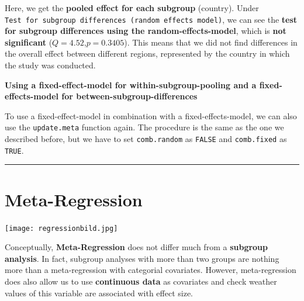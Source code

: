 \documentclass[]{book}
\begin{document}
Here, we get the \textbf{pooled effect for each subgroup} (country). Under \texttt{Test\ for\ subgroup\ differences\ (random\ effects\ model)}, we can see the \textbf{test for subgroup differences using the random-effects-model}, which is \textbf{not significant} (\(Q=4.52\),\(p=0.3405\)). This means that we did not find differences in the overall effect between different regions, represented by the country in which the study was conducted.

\begin{rmdachtung}
\textbf{Using a fixed-effect-model for within-subgroup-pooling and a
fixed-effects-model for between-subgroup-differences}

To use a fixed-effect-model in combination with a fixed-effects-model,
we can also use the \texttt{update.meta} function again. The procedure
is the same as the one we described before, but we have to set
\texttt{comb.random} as \texttt{FALSE} and \texttt{comb.fixed} as
\texttt{TRUE}.
\end{rmdachtung}

\begin{center}\rule{0.5\linewidth}{\linethickness}\end{center}

\hypertarget{metareg}{%
\chapter{Meta-Regression}\label{metareg}}

\texttt{[image: regressionbild.jpg]}

Conceptually, \textbf{Meta-Regression} does not differ much from a \textbf{subgroup analysis}. In fact, subgroup analyses with more than two groups are nothing more than a meta-regression with categorial covariates. However, meta-regression does also allow us to use \textbf{continuous data} as covariates and check weather values of this variable are associated with effect size.
\end{document}
